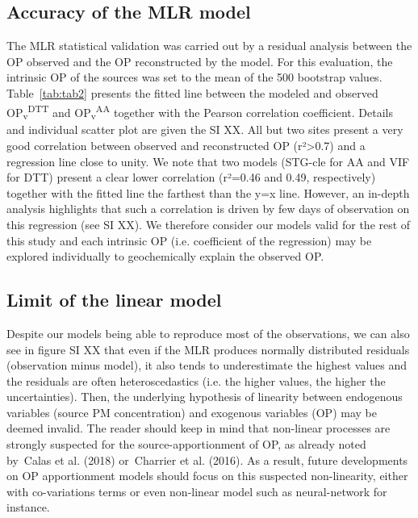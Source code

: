 \documentclass[
]{article}
\begin{document}
\hypertarget{accuracy-of-the-mlr-model}{%
\subsection{Accuracy of the MLR model}\label{accuracy-of-the-mlr-model}}

The MLR statistical validation was carried out by a residual analysis
between the OP observed and the OP reconstructed by the model. For this
evaluation, the intrinsic OP of the sources was set to the mean of the
500 bootstrap values. Table~\protect\hyperlink{tab:tab2}{{[}tab:tab2{]}}
presents the fitted line between the modeled and observed
OP\textsubscript{v}\textsuperscript{DTT} and
OP\textsubscript{v}\textsuperscript{AA} together with the Pearson
correlation coefficient. Details and individual scatter plot are given
the SI XX. All but two sites present a very good correlation between
observed and reconstructed OP (r²\textgreater0.7) and a regression line
close to unity. We note that two models (STG-cle for AA and VIF for DTT)
present a clear lower correlation (r²=0.46 and 0.49, respectively)
together with the fitted line the farthest than the y=x line. However,
an in-depth analysis highlights that such a correlation is driven by few
days of observation on this regression (see SI XX). We therefore
consider our models valid for the rest of this study and each intrinsic
OP (i.e. coefficient of the regression) may be explored individually to
geochemically explain the observed OP.

\hypertarget{limit-of-the-linear-model}{%
\subsection{Limit of the linear model}\label{limit-of-the-linear-model}}

Despite our models being able to reproduce most of the observations, we
can also see in figure SI XX that even if the MLR produces normally
distributed residuals (observation minus model), it also tends to
underestimate the highest values and the residuals are often
heteroscedastics (i.e. the higher values, the higher the uncertainties).
Then, the underlying hypothesis of linearity between endogenous
variables (source PM concentration) and exogenous variables (OP) may be
deemed invalid. The reader should keep in mind that non-linear processes
are strongly suspected for the source-apportionment of OP, as already
noted by~Calas et al. (2018) or~Charrier et al. (2016). As a result,
future developments on OP apportionment models should focus on this
suspected non-linearity, either with co-variations terms or even
non-linear model such as neural-network for instance.
\end{document}
